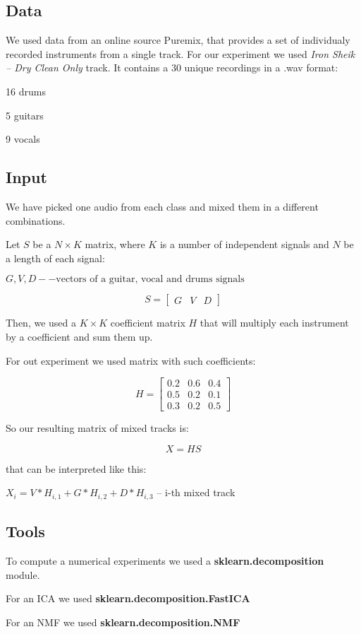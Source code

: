 \documentclass[../main.tex]{subfiles} %
\begin{document}
\subsection{Data}

We used data from an online source Puremix, that provides a set of individualy recorded instruments from a single track. For our experiment we used \textit{Iron Sheik -- Dry Clean Only} track. It contains a 30 unique recordings in a .wav format:
\begin{list}{--}{spacing}
	\item 16 drums
	\item 5 guitars
	\item 9 vocals
\end{list}

\subsection{Input}


We have picked one audio from each class and mixed them in a different combinations.

Let $S$ be a $N \times K$ matrix, where $K$ is a number of independent signals and $N$ be a length of each signal:


$G, V, D --\text{vectors of a guitar, vocal and drums signals}$

$$S = \begin{bmatrix}
G & V & D
\end{bmatrix}$$

Then, we used a $K \times K$ coefficient matrix $H$ that will multiply each instrument by a coefficient and sum them up.

For out experiment we used matrix with such coefficients:

$$H = \begin{bmatrix}
0.2 & 0.6 & 0.4 \\
0.5 & 0.2 & 0.1 \\
0.3 & 0.2 & 0.5
\end{bmatrix}$$

So our resulting matrix of mixed tracks is:

$$X = H S$$

that can be interpreted like this:

$X_i = V * H_{i, 1} + G * H_{i, 2} + D * H_{i, 3} $ -- i-th mixed track


\subsection{Tools}

To compute a numerical experiments we used a \textbf{sklearn.decomposition} module.


For an ICA we used \textbf{sklearn.decomposition.FastICA}

For an NMF we used \textbf{sklearn.decomposition.NMF}
\end{document}
